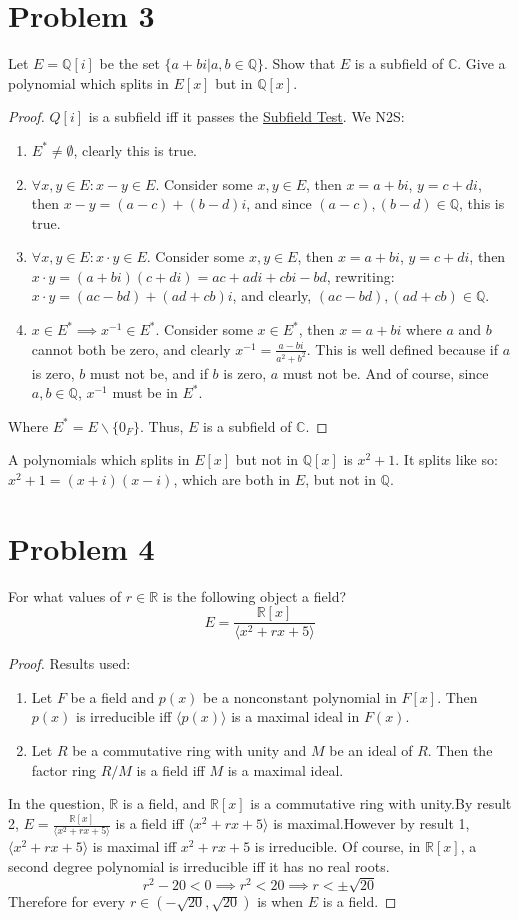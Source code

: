 \documentclass[hidelinks,12pt]{article}
\newcommand{\C}{\mathbb{C}}
\newcommand{\R}{\mathbb{R}}
\newcommand{\Q}{\mathbb{Q}}
\begin{document}
\section{Problem 3}Let $E=\Q[i]$ be the set $\{a+bi|a,b\in\Q\}$. Show that $E$ is a subfield of $\C$. Give a polynomial which splits in $E[x]$ but in $\Q[x]$.\begin{proof}
$Q[i]$ is a subfield iff it passes the \href{https://proofwiki.org/wiki/Subfield_Test}{\color{cyan}Subfield Test}. We N2S:\begin{enumerate}
    \item $E^*\neq\emptyset$, clearly this is true.
    \item $\forall x,y\in E:x-y\in E$. Consider some $x,y\in E$, then $x=a+bi$, $y=c+di$, then $x-y=(a-c)+(b-d)i$, and since $(a-c),(b-d)\in\Q$, this is true.
    \item $\forall x,y\in E:x\cdot y\in E$. Consider some $x,y\in E$, then $x=a+bi$, $y=c+di$, then $x\cdot y=(a+bi)(c+di)=ac+adi+cbi-bd$, rewriting: $x\cdot y=(ac-bd)+(ad+cb)i$, and clearly, $(ac-bd),(ad+cb)\in\Q$.
    \item $x\in E^*\implies x^{-1}\in E^*$. Consider some $x\in E^*$, then $x=a+bi$ where $a$ and $b$ cannot both be zero, and clearly $x^{-1}=\frac{a-bi}{a^2+b^2}$. This is well defined because if $a$ is zero, $b$ must not be, and if $b$ is zero, $a$ must not be. And of course, since $a,b\in\Q$, $x^{-1}$ must be in $E^*$.
\end{enumerate}
Where $E^*=E\backslash\{0_F\}$. Thus, $E$ is a subfield of $\C$.
\end{proof}
A polynomials which splits in $E[x]$ but not in $\Q[x]$ is $x^2+1$. It splits like so: $x^2+1=(x+i)(x-i)$, which are both in $E$, but not in $\Q$. 
\section{Problem 4}For what values of $r\in\R$ is the following object a field? $$E=\frac{\R[x]}{\langle x^2+rx+5\rangle}$$ \begin{proof}Results used:\begin{enumerate}
    \item Let $F$ be a field and $p(x)$ be a nonconstant polynomial in $F[x]$. Then $p(x)$ is irreducible iff $\langle p(x)\rangle$ is a maximal ideal in $F(x)$.
    \item Let $R$ be a commutative ring with unity and $M$ be an ideal of $R$. Then the factor ring $R/M$ is a field iff $M$ is a maximal ideal.
\end{enumerate}
In the question, $\R$ is a field, and $\R[x]$ is a commutative ring with unity.\newline By result 2, $E=\frac{\R[x]}{\langle x^2+rx+5\rangle}$ is a field iff $\langle x^2+rx+5\rangle$ is maximal.\newline However by result 1, $\langle x^2+rx+5\rangle$ is maximal iff $x^2+rx+5$ is irreducible. Of course, in $\R[x]$, a second degree polynomial is irreducible iff it has no real roots. $$r^2-20<0\implies r^2<20\implies r<\pm\sqrt{20}$$ Therefore for every $r\in(-\sqrt{20},\sqrt{20})$ is when $E$ is a field.
\end{proof}
\end{document}
